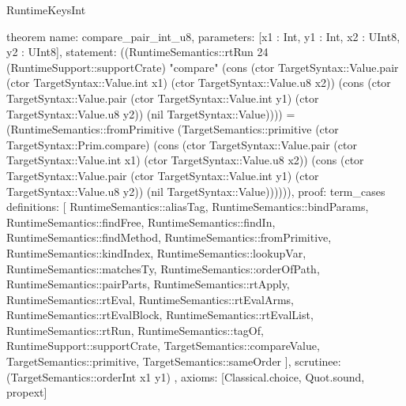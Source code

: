 \begin{lexlean}{RuntimeKeysInt}
\begin{semanticmodule}
theorem{
  name: compare_pair_int_u8,
  parameters: [x1 : Int, y1 : Int, x2 : UInt8, y2 : UInt8],
  statement: ((RuntimeSemantics::rtRun 24 (RuntimeSupport::supportCrate) "compare" (cons (ctor TargetSyntax::Value.pair (ctor TargetSyntax::Value.int x1) (ctor TargetSyntax::Value.u8 x2)) (cons (ctor TargetSyntax::Value.pair (ctor TargetSyntax::Value.int y1) (ctor TargetSyntax::Value.u8 y2)) (nil TargetSyntax::Value)))) = (RuntimeSemantics::fromPrimitive (TargetSemantics::primitive (ctor TargetSyntax::Prim.compare) (cons (ctor TargetSyntax::Value.pair (ctor TargetSyntax::Value.int x1) (ctor TargetSyntax::Value.u8 x2)) (cons (ctor TargetSyntax::Value.pair (ctor TargetSyntax::Value.int y1) (ctor TargetSyntax::Value.u8 y2)) (nil TargetSyntax::Value)))))),
  proof: term_cases{
    definitions: [
      RuntimeSemantics::aliasTag,
      RuntimeSemantics::bindParams,
      RuntimeSemantics::findFree,
      RuntimeSemantics::findIn,
      RuntimeSemantics::findMethod,
      RuntimeSemantics::fromPrimitive,
      RuntimeSemantics::kindIndex,
      RuntimeSemantics::lookupVar,
      RuntimeSemantics::matchesTy,
      RuntimeSemantics::orderOfPath,
      RuntimeSemantics::pairParts,
      RuntimeSemantics::rtApply,
      RuntimeSemantics::rtEval,
      RuntimeSemantics::rtEvalArms,
      RuntimeSemantics::rtEvalBlock,
      RuntimeSemantics::rtEvalList,
      RuntimeSemantics::rtRun,
      RuntimeSemantics::tagOf,
      RuntimeSupport::supportCrate,
      TargetSemantics::compareValue,
      TargetSemantics::primitive,
      TargetSemantics::sameOrder
    ],
    scrutinee: (TargetSemantics::orderInt x1 y1)
  },
  axioms: [Classical.choice, Quot.sound, propext]
}


\end{semanticmodule}
\end{lexlean}
